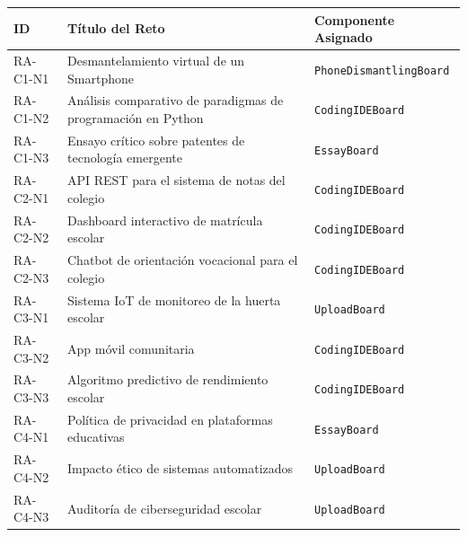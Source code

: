 \documentclass{article}
\begin{document}
\begin{table}[h!]
    \centering
    \renewcommand{\arraystretch}{1.3}
    \begin{tabularx}{\textwidth}{l X l}
        \toprule
        \textbf{ID} & \textbf{Título del Reto} & \textbf{Componente Asignado} \\
        \midrule
        RA-C1-N1 & Desmantelamiento virtual de un Smartphone & \texttt{PhoneDismantlingBoard} \\
        RA-C1-N2 & Análisis comparativo de paradigmas de programación en Python & \texttt{CodingIDEBoard} \\
        RA-C1-N3 & Ensayo crítico sobre patentes de tecnología emergente & \texttt{EssayBoard} \\
        RA-C2-N1 & API REST para el sistema de notas del colegio & \texttt{CodingIDEBoard} \\
        RA-C2-N2 & Dashboard interactivo de matrícula escolar & \texttt{CodingIDEBoard} \\
        RA-C2-N3 & Chatbot de orientación vocacional para el colegio & \texttt{CodingIDEBoard} \\
        RA-C3-N1 & Sistema IoT de monitoreo de la huerta escolar & \texttt{UploadBoard} \\
        RA-C3-N2 & App móvil comunitaria & \texttt{CodingIDEBoard} \\
        RA-C3-N3 & Algoritmo predictivo de rendimiento escolar & \texttt{CodingIDEBoard} \\
        RA-C4-N1 & Política de privacidad en plataformas educativas & \texttt{EssayBoard} \\
        RA-C4-N2 & Impacto ético de sistemas automatizados & \texttt{UploadBoard} \\
        RA-C4-N3 & Auditoría de ciberseguridad escolar & \texttt{UploadBoard} \\
        \bottomrule
    \end{tabularx}
\end{table}
\end{document}
